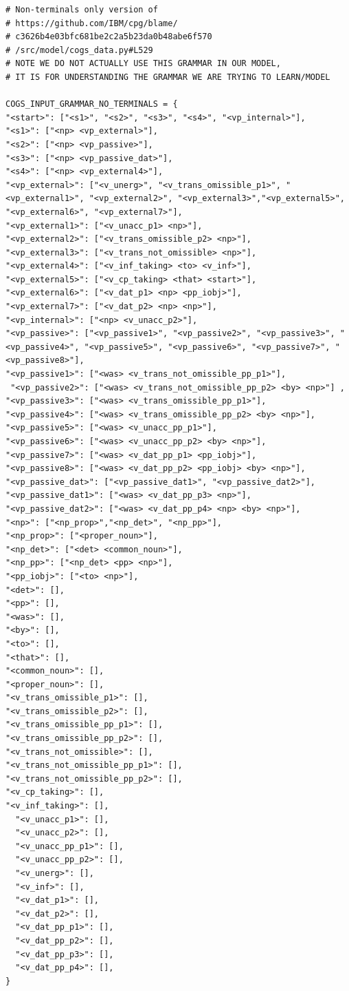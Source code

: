 \documentclass[11pt]{article}
\begin{document}
\begin{tiny}
\begin{verbatim}
# Non-terminals only version of
# https://github.com/IBM/cpg/blame/
# c3626b4e03bfc681be2c2a5b23da0b48abe6f570
# /src/model/cogs_data.py#L529
# NOTE WE DO NOT ACTUALLY USE THIS GRAMMAR IN OUR MODEL,
# IT IS FOR UNDERSTANDING THE GRAMMAR WE ARE TRYING TO LEARN/MODEL

COGS_INPUT_GRAMMAR_NO_TERMINALS = {
"<start>": ["<s1>", "<s2>", "<s3>", "<s4>", "<vp_internal>"],
"<s1>": ["<np> <vp_external>"],
"<s2>": ["<np> <vp_passive>"],
"<s3>": ["<np> <vp_passive_dat>"],
"<s4>": ["<np> <vp_external4>"],
"<vp_external>": ["<v_unerg>", "<v_trans_omissible_p1>", "<vp_external1>", "<vp_external2>", "<vp_external3>","<vp_external5>", "<vp_external6>", "<vp_external7>"],
"<vp_external1>": ["<v_unacc_p1> <np>"],
"<vp_external2>": ["<v_trans_omissible_p2> <np>"],
"<vp_external3>": ["<v_trans_not_omissible> <np>"],
"<vp_external4>": ["<v_inf_taking> <to> <v_inf>"],
"<vp_external5>": ["<v_cp_taking> <that> <start>"],
"<vp_external6>": ["<v_dat_p1> <np> <pp_iobj>"],
"<vp_external7>": ["<v_dat_p2> <np> <np>"],
"<vp_internal>": ["<np> <v_unacc_p2>"],
"<vp_passive>": ["<vp_passive1>", "<vp_passive2>", "<vp_passive3>", "<vp_passive4>", "<vp_passive5>", "<vp_passive6>", "<vp_passive7>", "<vp_passive8>"],
"<vp_passive1>": ["<was> <v_trans_not_omissible_pp_p1>"],
 "<vp_passive2>": ["<was> <v_trans_not_omissible_pp_p2> <by> <np>"] ,
"<vp_passive3>": ["<was> <v_trans_omissible_pp_p1>"],
"<vp_passive4>": ["<was> <v_trans_omissible_pp_p2> <by> <np>"],
"<vp_passive5>": ["<was> <v_unacc_pp_p1>"],
"<vp_passive6>": ["<was> <v_unacc_pp_p2> <by> <np>"],
"<vp_passive7>": ["<was> <v_dat_pp_p1> <pp_iobj>"],
"<vp_passive8>": ["<was> <v_dat_pp_p2> <pp_iobj> <by> <np>"],
"<vp_passive_dat>": ["<vp_passive_dat1>", "<vp_passive_dat2>"],
"<vp_passive_dat1>": ["<was> <v_dat_pp_p3> <np>"],
"<vp_passive_dat2>": ["<was> <v_dat_pp_p4> <np> <by> <np>"],
"<np>": ["<np_prop>","<np_det>", "<np_pp>"],
"<np_prop>": ["<proper_noun>"],
"<np_det>": ["<det> <common_noun>"],
"<np_pp>": ["<np_det> <pp> <np>"],
"<pp_iobj>": ["<to> <np>"],
"<det>": [],
"<pp>": [],
"<was>": [],
"<by>": [],
"<to>": [],
"<that>": [],
"<common_noun>": [],
"<proper_noun>": [],
"<v_trans_omissible_p1>": [],
"<v_trans_omissible_p2>": [],
"<v_trans_omissible_pp_p1>": [],
"<v_trans_omissible_pp_p2>": [],
"<v_trans_not_omissible>": [],
"<v_trans_not_omissible_pp_p1>": [],
"<v_trans_not_omissible_pp_p2>": [],
"<v_cp_taking>": [],
"<v_inf_taking>": [],
  "<v_unacc_p1>": [],
  "<v_unacc_p2>": [],
  "<v_unacc_pp_p1>": [],
  "<v_unacc_pp_p2>": [],
  "<v_unerg>": [],
  "<v_inf>": [],
  "<v_dat_p1>": [],
  "<v_dat_p2>": [],
  "<v_dat_pp_p1>": [],
  "<v_dat_pp_p2>": [],
  "<v_dat_pp_p3>": [],
  "<v_dat_pp_p4>": [],
}
\end{verbatim}
\end{tiny}
\end{document}
